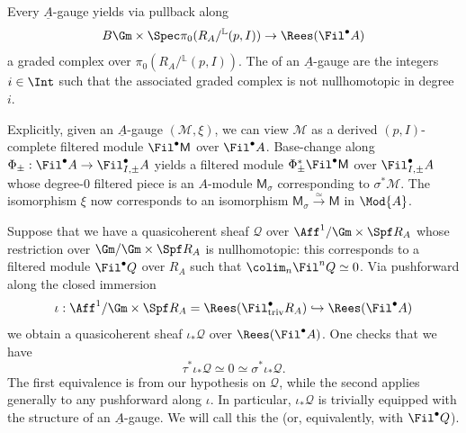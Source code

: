 \documentclass[10pt]{amsart}
\begin{document}
\begin{definition}
\label{defn:A-gauge_HT_weights}
Every $\underline{A}$-gauge yields via pullback along  
\[
B\Gm\times \Spec \pi_0(R_A/{}^{\mathbb{L}}(p,I))\to \Rees(\Fil^\bullet A)
\]
a graded complex over $\pi_0(R_A/{}^{\mathbb{L}}(p,I))$. The  of an $\underline{A}$-gauge are the integers $i\in \Int$ such that the associated graded complex is not nullhomotopic in degree $i$.
\end{definition}



\begin{remark}
\label{rem:sigma_star_expl}
Explicitly, given an $\underline{A}$-gauge $(\mathcal{M},\xi)$, we can view $\mathcal{M}$ as a derived $(p,I)$-complete filtered module $\Fil^\bullet\mathsf{M}$ over $\Fil^\bullet A$. Base-change along $\Phi_{\pm}:\Fil^\bullet A\to \Fil^\bullet_{I,\pm}A$ yields a filtered module $\Phi_{\pm}^*\Fil^\bullet \mathsf{M}$ over $\Fil^\bullet_{I,\pm}A$ whose degree-$0$ filtered piece is an $A$-module $\mathsf{M}_\sigma$ corresponding to $\sigma^*\mathcal{M}$. The isomorphism $\xi$ now corresponds to an isomorphism $\mathsf{M}_\sigma\xrightarrow{\simeq}\mathsf{M}$ in $\Mod{A}$. 
\end{remark}

\begin{remark}
\label{rem:parasitic_gauges}
Suppose that we have a quasicoherent sheaf $\mathcal{Q}$ over $\Aff^1/\Gm\times\Spf R_A$ whose restriction over $\Gm/\Gm\times\Spf R_A$ is nullhomotopic: this corresponds to a filtered module $\Fil^\bullet Q$ over $R_A$ such that $\colim_n \Fil^nQ \simeq 0$. Via pushforward along the closed immersion 
\[
\iota:\Aff^1/\Gm\times\Spf R_A = \Rees(\Fil^\bullet_{\mathrm{triv}}R_A)\hookrightarrow \Rees(\Fil^\bullet A)
\]
we obtain a quasicoherent sheaf $\iota_* \mathcal{Q}$ over $\Rees(\Fil^\bullet A)$. One checks that we have
\[
\tau^*\iota_* \mathcal{Q} \simeq 0 \simeq \sigma^*\iota_* \mathcal{Q}.
\]
The first equivalence is from our hypothesis on $\mathcal{Q}$, while the second applies generally to any pushforward along $\iota$. In particular, $\iota_* \mathcal{Q}$ is trivially equipped with the structure of an $\underline{A}$-gauge. We will call this the  (or, equivalently, with $\Fil^\bullet Q$).
\end{remark}  
\end{document}
